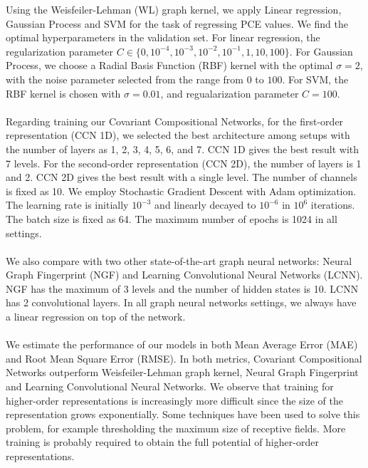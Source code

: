 \documentclass[a4paper]{article}
\begin{document}
Using the Weisfeiler-Lehman (WL) graph kernel, we apply Linear regression, Gaussian Process and SVM for the task of regressing PCE values. We find the optimal hyperparameters in the validation set. For linear regression, the regularization parameter $C \in \{0, 10^{-4}, 10^{-3}, 10^{-2}, 10^{-1}, 1, 10, 100\}$. For Gaussian Process, we choose a Radial Basis Function (RBF) kernel with the optimal $\sigma = 2$, with the noise parameter selected from the range from $0$ to $100$. For SVM, the RBF kernel is chosen with $\sigma = 0.01$, and regualarization parameter $C = 100$. \\ \\
Regarding training our Covariant Compositional Networks, for the first-order representation (CCN 1D), we selected the best architecture among setups with the number of layers as 1, 2, 3, 4, 5, 6, and 7. CCN 1D gives the best result with 7 levels. For the second-order representation (CCN 2D), the number of layers is 1 and 2. CCN 2D gives the best result with a single level. The number of channels is fixed as 10. We employ Stochastic Gradient Descent with Adam optimization. The learning rate is initially $10^{-3}$ and linearly decayed to $10^{-6}$ in $10^6$ iterations. The batch size is fixed as 64. The maximum number of epochs is 1024 in all settings. \\ \\
We also compare with two other state-of-the-art graph neural networks: Neural Graph Fingerprint (NGF) and Learning Convolutional Neural Networks (LCNN). NGF has the maximum of 3 levels and the number of hidden states is 10. LCNN has 2 convolutional layers. In all graph neural networks settings, we always have a linear regression on top of the network. \\ \\
We estimate the performance of our models in both Mean Average Error (MAE) and Root Mean Square Error (RMSE). In both metrics, Covariant Compositional Networks outperform Weisfeiler-Lehman graph kernel, Neural Graph Fingerprint and Learning Convolutional Neural Networks. We observe that training for higher-order representations is increasingly more difficult since the size of the representation grows exponentially. Some techniques have been used to solve this problem, for example thresholding the maximum size of receptive fields. More training is probably required to obtain the full potential of higher-order representations.
\end{document}
